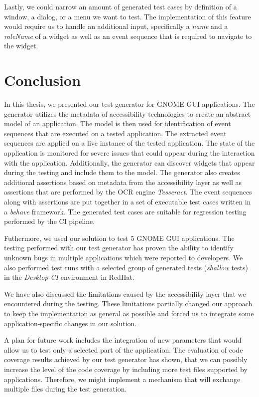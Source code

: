 Lastly, we could narrow an amount of generated test cases by definition of a window, a dialog, or a menu we want to test. The implementation of this feature would require us to handle an additional input, specifically a \textit{name} and a \textit{roleName} of a widget as well as an event sequence that is required to navigate to the widget.

\chapter{Conclusion}

In this thesis, we presented our test generator for GNOME GUI applications. The generator utilizes the metadata of accessibility technologies to create an abstract model of an application. The model is then used for identification of event sequences that are executed on a tested application. The extracted event sequences are applied on a live instance of the tested application. The state of the application is monitored for severe issues that could appear during the interaction with the application. Additionally, the generator can discover widgets that appear during the testing and include them to the model. The generator also creates additional assertions based on metadata from the accessibility layer as well as assertions that are performed by the OCR engine \textit{Tesseract}. The event sequences along with assertions are put together in a set of executable test cases written in a \textit{behave} framework. The generated test cases are suitable for regression testing performed by the CI pipeline.  

Futhermore, we used our solution to test 5 GNOME GUI applications. The testing performed with our test generator has proven the ability to identify unknown bugs in multiple applications which were reported to developers. We also performed test runs with a selected group of generated tests (\textit{shallow} tests) in the \textit{Desktop-CI} environment in RedHat.

We have also discussed the limitations caused by the accessibility layer that we encountered during the testing. These limitations partially changed our approach to keep the implementation as general as possible and forced us to integrate some application-specific changes in our solution.

A plan for future work includes the integration of new parameters that would allow us to test only a selected part of the application. The evaluation of code coverage results achieved by our test generator has shown, that we can possibly increase the level of the code coverage by including more test files supported by applications. Therefore, we might implement a mechanism that will exchange multiple files during the test generation.  